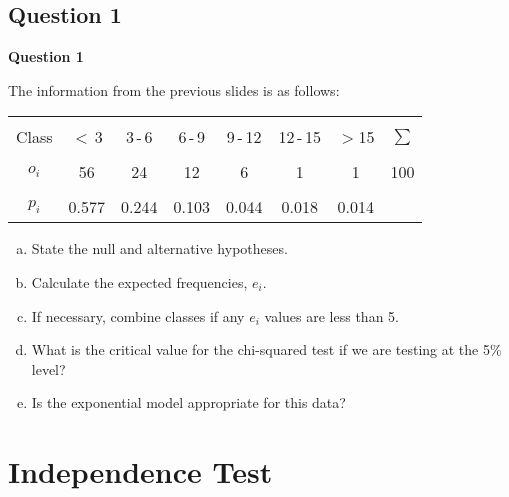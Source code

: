 \documentclass[compress]{beamer}        %
\makeatletter
\newcommand{\tcb}{\textcolor{beamer@blendedblue}}
\makeatother
\begin{document}
\subsection{Question 1}
\begin{frame}{\bf \tcb{Question 1}}

The information from the previous slides is as follows:
\begin{center}
\begin{tabular}{|c|cccccc|c|}
\hline
&&&&&&&\\[-0.3cm]
Class & $<$\,3 & 3\,-\,6 & 6\,-\,9 & 9\,-\,12 & 12\,-\,15 & $>$15 & $\sum$ \\[0.1cm]
\hline
&&&&&&&\\[-0.3cm]
$o_i$ & 56 & 24 & 12 &  6 &  1 &  1 & 100\\[0.1cm]
\hline
&&&&&&&\\[-0.3cm]
$p_i$ & 0.577 & 0.244 & 0.103 & 0.044 & 0.018 & 0.014 & \\[0.1cm]
\hline
\end{tabular}
\end{center}

\begin{enumerate}[a)]\itemsep0.3cm
\item State the null and alternative hypotheses.
\item Calculate the expected frequencies, $e_i$.
\item If necessary, combine classes if any $e_i$ values are less than 5.
\item What is the critical value for the chi-squared test if we are testing at the 5\% level?
\item Is the exponential model appropriate for this data?
\end{enumerate}


\end{frame}








\section{Independence Test}
\end{document}
